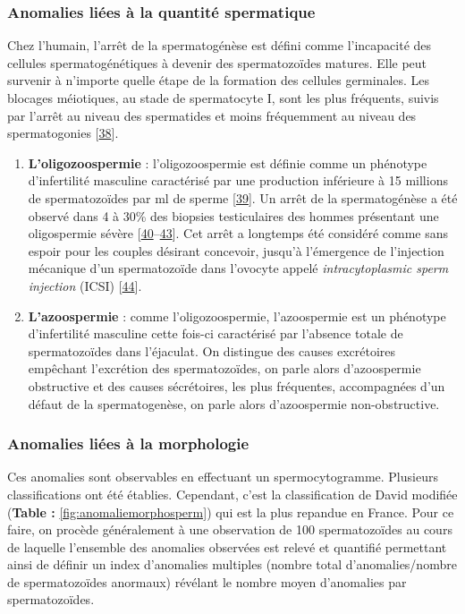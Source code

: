 \documentclass[12pt,twoside]{ugathesis}
\theoremstyle{definition}
\theoremstyle{definition}
\theoremstyle{remark}
\begin{document}
\newpage

\subsubsection{Anomalies liées à la quantité
spermatique}\label{infquant}

Chez l'humain, l'arrêt de la spermatogénèse est défini comme
l'incapacité des cellules spermatogénétiques à devenir des
spermatozoïdes matures. Elle peut survenir à n'importe quelle étape de
la formation des cellules germinales. Les blocages méiotiques, au stade
de spermatocyte I, sont les plus fréquents, suivis par l'arrêt au niveau
des spermatides et moins fréquemment au niveau des spermatogonies
{[}\protect\hyperlink{ref-Girgis}{38}{]}.

\begin{enumerate}
\def\labelenumi{\arabic{enumi}.}
\item
  \textbf{L'oligozoospermie} : l'oligozoospermie est définie comme un
  phénotype d'infertilité masculine caractérisé par une production
  inférieure à 15 millions de spermatozoïdes par ml de sperme
  {[}\protect\hyperlink{ref-Cooper2010}{39}{]}. Un arrêt de la
  spermatogénèse a été observé dans 4 à 30\% des biopsies testiculaires
  des hommes présentant une oligospermie sévère
  {[}\protect\hyperlink{ref-Colgan1980}{40}--\protect\hyperlink{ref-WONG1973}{43}{]}.
  Cet arrêt a longtemps été considéré comme sans espoir pour les couples
  désirant concevoir, jusqu'à l'émergence de l'injection mécanique d'un
  spermatozoïde dans l'ovocyte appelé \emph{intracytoplasmic sperm
  injection} (ICSI) {[}\protect\hyperlink{ref-Palermo1992}{44}{]}.
\item
  \textbf{L'azoospermie} : comme l'oligozoospermie, l'azoospermie est un
  phénotype d'infertilité masculine cette fois-ci caractérisé par
  l'absence totale de spermatozoïdes dans l'éjaculat. On distingue des
  causes excrétoires empêchant l'excrétion des spermatozoïdes, on parle
  alors d'azoospermie obstructive et des causes sécrétoires, les plus
  fréquentes, accompagnées d'un défaut de la spermatogenèse, on parle
  alors d'azoospermie non-obstructive.
\end{enumerate}

\subsubsection{Anomalies liées à la
morphologie}\label{anomalies-liees-a-la-morphologie}

Ces anomalies sont observables en effectuant un spermocytogramme.
Plusieurs classifications ont été établies. Cependant, c'est la
classification de David modifiée (\textbf{Table :}
\ref{fig:anomaliemorphosperm}) qui est la plus repandue en France. Pour
ce faire, on procède généralement à une observation de 100
spermatozoïdes au cours de laquelle l'ensemble des anomalies observées
est relevé et quantifié permettant ainsi de définir un index d'anomalies
multiples (nombre total d'anomalies/nombre de spermatozoïdes anormaux)
révélant le nombre moyen d'anomalies par spermatozoïdes.
\end{document}
